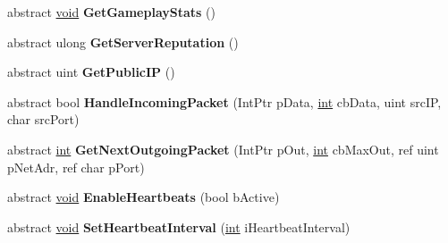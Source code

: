 \begin{DoxyCompactItemize}
\item 
\hypertarget{classValve_1_1Steamworks_1_1ISteamGameServer_acd15fd5c2e146b7c052625b8988be9e5}{}abstract \hyperlink{SDL__audio_8h_a52835ae37c4bb905b903cbaf5d04b05f}{void} {\bfseries Get\+Gameplay\+Stats} ()\label{classValve_1_1Steamworks_1_1ISteamGameServer_acd15fd5c2e146b7c052625b8988be9e5}

\item 
\hypertarget{classValve_1_1Steamworks_1_1ISteamGameServer_a378abfc80e1f2c7943bd0e31de1e0318}{}abstract ulong {\bfseries Get\+Server\+Reputation} ()\label{classValve_1_1Steamworks_1_1ISteamGameServer_a378abfc80e1f2c7943bd0e31de1e0318}

\item 
\hypertarget{classValve_1_1Steamworks_1_1ISteamGameServer_a0ef1854cdf73fbe40576c63a7a6b75ca}{}abstract uint {\bfseries Get\+Public\+I\+P} ()\label{classValve_1_1Steamworks_1_1ISteamGameServer_a0ef1854cdf73fbe40576c63a7a6b75ca}

\item 
\hypertarget{classValve_1_1Steamworks_1_1ISteamGameServer_acc1e185ef7c03552517ac89fd50b3907}{}abstract bool {\bfseries Handle\+Incoming\+Packet} (Int\+Ptr p\+Data, \hyperlink{SDL__thread_8h_a6a64f9be4433e4de6e2f2f548cf3c08e}{int} cb\+Data, uint src\+I\+P, char src\+Port)\label{classValve_1_1Steamworks_1_1ISteamGameServer_acc1e185ef7c03552517ac89fd50b3907}

\item 
\hypertarget{classValve_1_1Steamworks_1_1ISteamGameServer_aaa122246fae2232c7a1f737e3b1d1654}{}abstract \hyperlink{SDL__thread_8h_a6a64f9be4433e4de6e2f2f548cf3c08e}{int} {\bfseries Get\+Next\+Outgoing\+Packet} (Int\+Ptr p\+Out, \hyperlink{SDL__thread_8h_a6a64f9be4433e4de6e2f2f548cf3c08e}{int} cb\+Max\+Out, ref uint p\+Net\+Adr, ref char p\+Port)\label{classValve_1_1Steamworks_1_1ISteamGameServer_aaa122246fae2232c7a1f737e3b1d1654}

\item 
\hypertarget{classValve_1_1Steamworks_1_1ISteamGameServer_a88889e39263525da1130fb7547c6875f}{}abstract \hyperlink{SDL__audio_8h_a52835ae37c4bb905b903cbaf5d04b05f}{void} {\bfseries Enable\+Heartbeats} (bool b\+Active)\label{classValve_1_1Steamworks_1_1ISteamGameServer_a88889e39263525da1130fb7547c6875f}

\item 
\hypertarget{classValve_1_1Steamworks_1_1ISteamGameServer_a0ad8541845fb89200f208cb68a07d934}{}abstract \hyperlink{SDL__audio_8h_a52835ae37c4bb905b903cbaf5d04b05f}{void} {\bfseries Set\+Heartbeat\+Interval} (\hyperlink{SDL__thread_8h_a6a64f9be4433e4de6e2f2f548cf3c08e}{int} i\+Heartbeat\+Interval)\label{classValve_1_1Steamworks_1_1ISteamGameServer_a0ad8541845fb89200f208cb68a07d934}


\end{DoxyCompactItemize}
